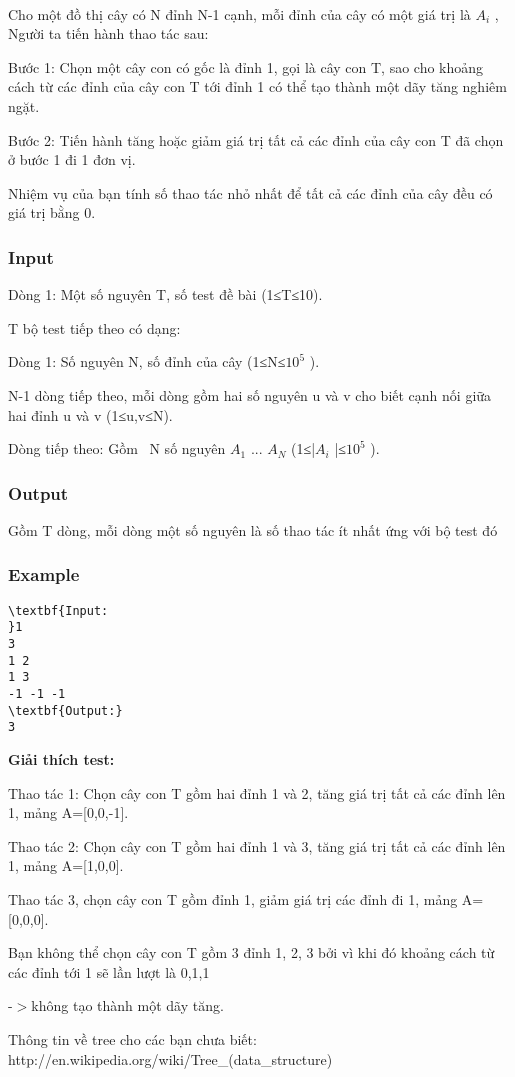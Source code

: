 

 

Cho một đồ thị cây có N đỉnh N-1 cạnh, mỗi đỉnh của cây có một giá trị là $A_{i}$ , Người ta tiến hành thao tác sau:

Bước 1: Chọn một cây con có gốc là đỉnh 1, gọi là cây con T, sao cho khoảng cách từ các đỉnh của cây con T tới đỉnh 1 có thể tạo thành một dãy tăng nghiêm ngặt.

Bước 2: Tiến hành tăng hoặc giảm giá trị tất cả các đỉnh của cây con T đã chọn ở bước 1 đi 1 đơn vị.

Nhiệm vụ của bạn tính số thao tác nhỏ nhất để tất cả các đỉnh của cây đều có giá trị bằng 0.

\subsubsection{Input}

Dòng 1: Một số nguyên T, số test đề bài (1≤T≤10).

T bộ test tiếp theo có dạng:

Dòng 1: Số nguyên N, số đỉnh của cây (1≤N≤$10^{5}$ ).

N-1 dòng tiếp theo, mỗi dòng gồm hai số nguyên u và v cho biết cạnh nối giữa hai đỉnh u và v (1≤u,v≤N).

Dòng tiếp theo: Gồm  N số nguyên $A_{1}$ ... $A_{N}$ (1≤|$A_{i}$ |≤$10^{5}$ ).

\subsubsection{Output}

Gồm T dòng, mỗi dòng một số nguyên là số thao tác ít nhất ứng với bộ test đó

\subsubsection{Example}
\begin{verbatim}
\textbf{Input:
}1
3
1 2
1 3
-1 -1 -1
\textbf{Output:}
3
\end{verbatim}

\textbf{Giải thích test:}

Thao tác 1: Chọn cây con T gồm hai đỉnh 1 và 2, tăng giá trị tất cả các đỉnh lên 1, mảng A=[0,0,-1].

Thao tác 2: Chọn cây con T gồm hai đỉnh 1 và 3, tăng giá trị tất cả các đỉnh lên 1, mảng A=[1,0,0].

Thao tác 3, chọn cây con T gồm đỉnh 1, giảm giá trị các đỉnh đi 1, mảng A=[0,0,0].

Bạn không thể chọn cây con T gồm 3 đỉnh 1, 2, 3 bởi vì khi đó khoảng cách từ các đỉnh tới 1 sẽ lần lượt là 0,1,1

-$>$không tạo thành một dãy tăng.

Thông tin về tree cho các bạn chưa biết: http://en.wikipedia.org/wiki/Tree\_(data\_structure)
